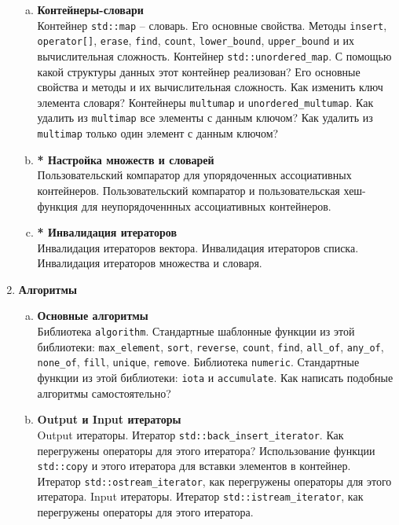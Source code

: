 \documentclass{article}
\begin{document}
\begin{enumerate}
\begin{enumerate}[a.]
\item \textbf{Контейнеры-словари}\\
Контейнер \texttt{std::map} -- словарь. Его основные свойства. Методы \texttt{insert}, \texttt{operator[]}, \texttt{erase}, \texttt{find}, \texttt{count}, \texttt{lower\_bound}, \texttt{upper\_bound} и их вычислительная сложность. Контейнер \texttt{std::unordered\_map}. С помощью какой структуры данных этот контейнер реализован? Его основные свойства и методы и их вычислительная сложность. Как изменить ключ элемента словаря?  Контейнеры \texttt{multumap} и \texttt{unordered\_multumap}. Как удалить из \texttt{multimap} все элементы с данным ключом? Как удалить из \texttt{multimap} только один элемент с данным ключом? 

\item \textbf{* Настройка множеств и словарей}\\
Пользовательский компаратор для упорядоченных ассоциативных контейнеров.
Пользовательский компаратор и пользовательская хеш-функция для неупорядоченнных ассоциативных контейнеров.

\item \textbf{* Инвалидация итераторов}\\
Инвалидация итераторов вектора. Инвалидация итераторов списка. Инвалидация итераторов множества и словаря.

\end{enumerate}




\item \textbf{Алгоритмы}
\begin{enumerate}[a.]

\item \textbf{Основные алгоритмы}\\
Библиотека \texttt{algorithm}. Стандартные шаблонные функции из этой библиотеки: \texttt{max\_element}, \texttt{sort}, \texttt{reverse}, \texttt{count}, \texttt{find}, \texttt{all\_of}, \texttt{any\_of}, \texttt{none\_of}, \texttt{fill}, \texttt{unique}, \texttt{remove}. Библиотека \texttt{numeric}. Стандартные функции из этой библиотеки: \texttt{iota} и \texttt{accumulate}. Как написать подобные алгоритмы самостоятельно?


\item \textbf{Output и Input итераторы}\\
Output итераторы. Итератор \texttt{std::back\_insert\_iterator}. Как перегружены операторы для этого итератора? Использование функции \texttt{std::copy} и этого итератора для вставки элементов в контейнер. Итератор \texttt{std::ostream\_iterator}, как перегружены операторы для этого итератора.
Input итераторы. Итератор \texttt{std::istream\_iterator}, как перегружены операторы для этого итератора.



\end{enumerate}
\end{enumerate}
\end{document}
